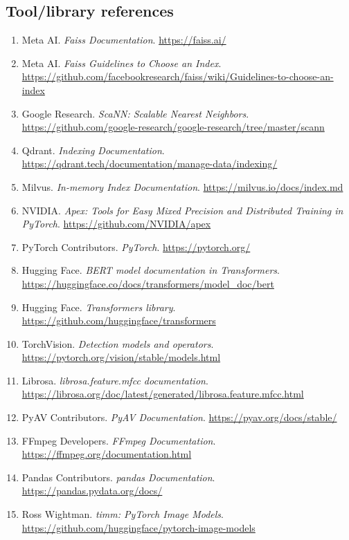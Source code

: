 \documentclass[12pt,a4paper]{article}
\begin{document}
\subsection{Tool/library references}
\begin{enumerate}[resume]
  \item Meta AI. \emph{Faiss Documentation}. \url{https://faiss.ai/}
  \item Meta AI. \emph{Faiss Guidelines to Choose an Index}. \url{https://github.com/facebookresearch/faiss/wiki/Guidelines-to-choose-an-index}
  \item Google Research. \emph{ScaNN: Scalable Nearest Neighbors}. \url{https://github.com/google-research/google-research/tree/master/scann}
  \item Qdrant. \emph{Indexing Documentation}. \url{https://qdrant.tech/documentation/manage-data/indexing/}
  \item Milvus. \emph{In-memory Index Documentation}. \url{https://milvus.io/docs/index.md}
  \item NVIDIA. \emph{Apex: Tools for Easy Mixed Precision and Distributed Training in PyTorch}. \url{https://github.com/NVIDIA/apex}
  \item PyTorch Contributors. \emph{PyTorch}. \url{https://pytorch.org/}
  \item Hugging Face. \emph{BERT model documentation in Transformers}. \url{https://huggingface.co/docs/transformers/model_doc/bert}
  \item Hugging Face. \emph{Transformers library}. \url{https://github.com/huggingface/transformers}
  \item TorchVision. \emph{Detection models and operators}. \url{https://pytorch.org/vision/stable/models.html}
  \item Librosa. \emph{librosa.feature.mfcc documentation}. \url{https://librosa.org/doc/latest/generated/librosa.feature.mfcc.html}
  \item PyAV Contributors. \emph{PyAV Documentation}. \url{https://pyav.org/docs/stable/}
  \item FFmpeg Developers. \emph{FFmpeg Documentation}. \url{https://ffmpeg.org/documentation.html}
  \item Pandas Contributors. \emph{pandas Documentation}. \url{https://pandas.pydata.org/docs/}
  \item Ross Wightman. \emph{timm: PyTorch Image Models}. \url{https://github.com/huggingface/pytorch-image-models}
\end{enumerate}
\end{document}
